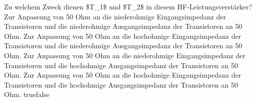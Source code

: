     {Zu welchem Zweck dienen \$T\_1\$ und \$T\_2\$ in diesem HF-Leistungsverstärker?}
    {Zur Anpassung von 50 Ohm an die niederohmige Eingangsimpedanz der Transistoren und die niederohmige Ausgangsimpedanz der Transistoren an 50 Ohm.}
    {Zur Anpassung von 50 Ohm an die hochohmige Eingangsimpedanz der Transistoren und die niederohmige Ausgangsimpedanz der Transistoren an 50 Ohm.}
    {Zur Anpassung von 50 Ohm an die niederohmige Eingangsimpedanz der Transistoren und die hochohmige Ausgangsimpedanz der Transistoren an 50 Ohm.}
    {Zur Anpassung von 50 Ohm an die hochohmige Eingangsimpedanz der Transistoren und die hochohmige Ausgangsimpedanz der Transistoren an 50 Ohm.}
    {true}{false}
